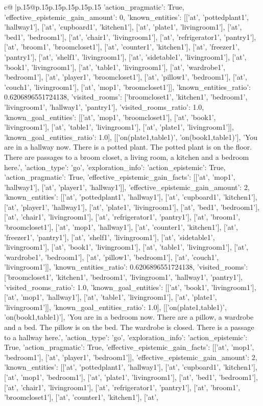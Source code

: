 \documentclass{article}
\begin{document}
{\begin{supertabular}{c@{$\;$}|p{.15\linewidth}@{}p{.15\linewidth}p{.15\linewidth}p{.15\linewidth}p{.15\linewidth}p{.15\linewidth}}
{{{'action_pragmatic': True, 'effective_epistemic_gain_amount': 0, 'known_entities': [['at', 'pottedplant1', 'hallway1'], ['at', 'cupboard1', 'kitchen1'], ['at', 'plate1', 'livingroom1'], ['at', 'bed1', 'bedroom1'], ['at', 'chair1', 'livingroom1'], ['at', 'refrigerator1', 'pantry1'], ['at', 'broom1', 'broomcloset1'], ['at', 'counter1', 'kitchen1'], ['at', 'freezer1', 'pantry1'], ['at', 'shelf1', 'livingroom1'], ['at', 'sidetable1', 'livingroom1'], ['at', 'book1', 'livingroom1'], ['at', 'table1', 'livingroom1'], ['at', 'wardrobe1', 'bedroom1'], ['at', 'player1', 'broomcloset1'], ['at', 'pillow1', 'bedroom1'], ['at', 'couch1', 'livingroom1'], ['at', 'mop1', 'broomcloset1']], 'known_entities_ratio': 0.6206896551724138, 'visited_rooms': ['broomcloset1', 'kitchen1', 'bedroom1', 'livingroom1', 'hallway1', 'pantry1'], 'visited_rooms_ratio': 1.0, 'known_goal_entities': [['at', 'mop1', 'broomcloset1'], ['at', 'book1', 'livingroom1'], ['at', 'table1', 'livingroom1'], ['at', 'plate1', 'livingroom1']], 'known_goal_entities_ratio': 1.0}}], [['on(plate1,table1)', 'on(book1,table1)'], 'You are in a hallway now. There is a potted plant. The potted plant is on the floor. There are passages to a broom closet, a living room, a kitchen and a bedroom here.', {'action_type': 'go', 'exploration_info': {'action_epistemic': True, 'action_pragmatic': True, 'effective_epistemic_gain_facts': [['at', 'mop1', 'hallway1'], ['at', 'player1', 'hallway1']], 'effective_epistemic_gain_amount': 2, 'known_entities': [['at', 'pottedplant1', 'hallway1'], ['at', 'cupboard1', 'kitchen1'], ['at', 'player1', 'hallway1'], ['at', 'plate1', 'livingroom1'], ['at', 'bed1', 'bedroom1'], ['at', 'chair1', 'livingroom1'], ['at', 'refrigerator1', 'pantry1'], ['at', 'broom1', 'broomcloset1'], ['at', 'mop1', 'hallway1'], ['at', 'counter1', 'kitchen1'], ['at', 'freezer1', 'pantry1'], ['at', 'shelf1', 'livingroom1'], ['at', 'sidetable1', 'livingroom1'], ['at', 'book1', 'livingroom1'], ['at', 'table1', 'livingroom1'], ['at', 'wardrobe1', 'bedroom1'], ['at', 'pillow1', 'bedroom1'], ['at', 'couch1', 'livingroom1']], 'known_entities_ratio': 0.6206896551724138, 'visited_rooms': ['broomcloset1', 'kitchen1', 'bedroom1', 'livingroom1', 'hallway1', 'pantry1'], 'visited_rooms_ratio': 1.0, 'known_goal_entities': [['at', 'book1', 'livingroom1'], ['at', 'mop1', 'hallway1'], ['at', 'table1', 'livingroom1'], ['at', 'plate1', 'livingroom1']], 'known_goal_entities_ratio': 1.0}}], [['on(plate1,table1)', 'on(book1,table1)'], 'You are in a bedroom now. There are a pillow, a wardrobe and a bed. The pillow is on the bed. The wardrobe is closed. There is a passage to a hallway here.', {'action_type': 'go', 'exploration_info': {'action_epistemic': True, 'action_pragmatic': True, 'effective_epistemic_gain_facts': [['at', 'mop1', 'bedroom1'], ['at', 'player1', 'bedroom1']], 'effective_epistemic_gain_amount': 2, 'known_entities': [['at', 'pottedplant1', 'hallway1'], ['at', 'cupboard1', 'kitchen1'], ['at', 'mop1', 'bedroom1'], ['at', 'plate1', 'livingroom1'], ['at', 'bed1', 'bedroom1'], ['at', 'chair1', 'livingroom1'], ['at', 'refrigerator1', 'pantry1'], ['at', 'broom1', 'broomcloset1'], ['at', 'counter1', 'kitchen1'], ['at', }}}
\end{supertabular}}
\end{document}

